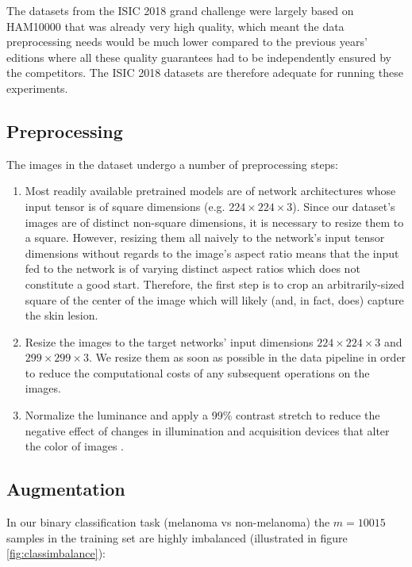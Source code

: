 The datasets from the \ac{ISIC} 2018 grand challenge \cite{isic2018} were largely based on \ac{HAM10000} that was already very high quality, which meant the data preprocessing needs would be much lower compared to the previous years' editions where all these quality guarantees had to be independently ensured by the competitors. The \ac{ISIC} 2018 datasets are therefore adequate for running these experiments.

\subsection{Preprocessing}
\label{subsection:preprocessing}

The images in the dataset undergo a number of preprocessing steps:

\begin{enumerate}
    \item Most readily available pretrained models are of network architectures whose input tensor is of square dimensions (e.g. $224 \times 224 \times 3$). Since our dataset's images are of distinct non-square dimensions, it is necessary to resize them to a square. However, resizing them all naively to the network's input tensor dimensions without regards to the image's aspect ratio means that the input fed to the network is of varying distinct aspect ratios which does not constitute a good start. Therefore, the first step is to crop an arbitrarily-sized square of the center of the image which will likely (and, in fact, does) capture the skin lesion.
    \item Resize the images to the target networks' input dimensions $224 \times 224 \times 3$ and $299 \times 299 \times 3$. We resize them as soon as possible in the data pipeline in order to reduce the computational costs of any subsequent operations on the images.
    \item Normalize the luminance and apply a 99\% contrast stretch to reduce the negative effect of changes in illumination and acquisition devices that alter the color of images \cite{colorconstancy}.
\end{enumerate}

\subsection{Augmentation}
\label{subsection:augmentation}

In our binary classification task (melanoma vs non-melanoma) the $m = 10015$ samples in the training set are highly imbalanced (illustrated in figure \ref{fig:classimbalance}):

